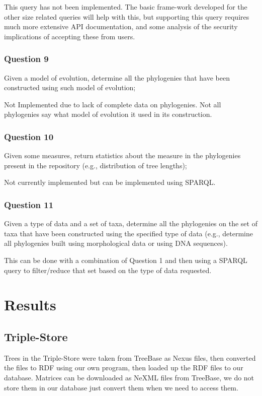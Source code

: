 \documentclass[10pt]{article}
\begin{document}
This query has not been implemented. The basic frame-work developed for the other
size related queries will help with this, but supporting this query requires much
more extensive API documentation, and some analysis of the security implications
of accepting these from users.


\subsubsection{Question 9}
Given a model of evolution, determine all the phylogenies that have been
constructed using such model of evolution;


Not Implemented due to lack of complete data on phylogenies.  Not all
phylogenies say what model of evolution it used in its construction.

\subsubsection{Question 10}
Given some measures, return statistics about the measure in the phylogenies
present in the repository (e.g., distribution of tree lengths);


Not currently implemented but can be implemented using SPARQL.

\subsubsection{Question 11}
Given a type of data and a set of taxa, determine all the phylogenies on the
set of taxa that have been constructed using the specified type of data (e.g.,
determine all phylogenies built using morphological data or using DNA
sequences).	


This can be done with a combination of Question 1 and then using a SPARQL query
to filter/reduce that set based on the type of data requested.

\section{Results}

\subsection{Triple-Store}

Trees in the Triple-Store were taken from TreeBase as Nexus files, then
converted the files to RDF using our own program, then loaded up the RDF files
to our database.  Matrices can be downloaded as NeXML files from TreeBase, we
do not store them in our database just convert them when we need to access
them.
\end{document}
